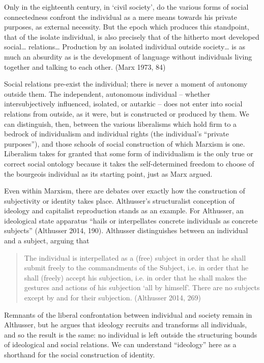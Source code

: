 \documentclass[12pt,oneside]{memoir}
\begin{document}
Only in the eighteenth century, in `civil society', do the various forms of social connectedness confront the individual as a mere means towards his private purposes, as external necessity. But the epoch which produces this standpoint, that of the isolate individual, is also precisely that of the hitherto most developed social{\ldots} relations{\ldots} Production by an isolated individual outside society{\ldots} is as much an absurdity as is the development of language without individuals living together and talking to each other. (Marx 1973, 84)

Social relations pre-exist the individual; there is never a moment of autonomy outside them. The independent, autonomous individual -- whether intersubjectively influenced, isolated, or autarkic -- does not enter into social relations from outside, as it were, but is constructed or produced by them. We can distinguish, then, between the various liberalisms which hold firm to a bedrock of individualism and individual rights (the individual's ``private purposes''), and those schools of social construction of which Marxism is one. Liberalism takes for granted that some form of individualism is the only true or correct social ontology because it takes the self-determined freedom to choose of the bourgeois individual as its starting point, just as Marx argued. 

Even within Marxism, there are debates over exactly how the construction of subjectivity or identity takes place. Althusser's structuralist conception of ideology and capitalist reproduction stands as an example. For Althusser, an ideological state apparatus ``hails or interpellates concrete individuals as concrete subjects'' (Althusser 2014, 190). Althusser distinguishes between an individual and a subject, arguing that

\begin{quote}
The individual is interpellated as a (free) subject in order that he shall submit freely to the commandments of the Subject, i.e. in order that he shall (freely) accept his subjection, i.e. in order that he shall makes the gestures and actions of his subjection `all by himself'. There are no subjects except by and for their subjection. (Althusser 2014, 269)
\end{quote}

Remnants of the liberal confrontation between individual and society remain in Althusser, but he argues that ideology recruits and transforms all individuals, and so the result is the same: no individual is left outside the structuring bounds of ideological and social relations. We can understand ``ideology'' here as a shorthand for the social construction of identity.
\end{document}
